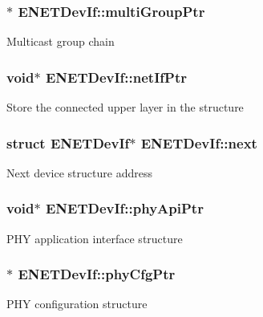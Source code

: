 \subsubsection[{\texorpdfstring{multi\+Group\+Ptr}{multiGroupPtr}}]{$\ast$ E\+N\+E\+T\+Dev\+If\+::multi\+Group\+Ptr}\hypertarget{structENETDevIf_ab01c067bf7f5d6b96698d4e1742de693}{}\label{structENETDevIf_ab01c067bf7f5d6b96698d4e1742de693}
Multicast group chain 
\subsubsection[{\texorpdfstring{net\+If\+Ptr}{netIfPtr}}]{\setlength{\rightskip}{0pt plus 5cm}void$\ast$ E\+N\+E\+T\+Dev\+If\+::net\+If\+Ptr}\hypertarget{structENETDevIf_a00a53ee84e7e89719ffcd7bd332c665f}{}\label{structENETDevIf_a00a53ee84e7e89719ffcd7bd332c665f}
Store the connected upper layer in the structure 
\subsubsection[{\texorpdfstring{next}{next}}]{\setlength{\rightskip}{0pt plus 5cm}struct {\bf E\+N\+E\+T\+Dev\+If}$\ast$ E\+N\+E\+T\+Dev\+If\+::next}\hypertarget{structENETDevIf_ab9a5c1191575dd02df163e36205fa5bd}{}\label{structENETDevIf_ab9a5c1191575dd02df163e36205fa5bd}
Next device structure address 
\subsubsection[{\texorpdfstring{phy\+Api\+Ptr}{phyApiPtr}}]{\setlength{\rightskip}{0pt plus 5cm}void$\ast$ E\+N\+E\+T\+Dev\+If\+::phy\+Api\+Ptr}\hypertarget{structENETDevIf_ade848b993084a443534865584337743b}{}\label{structENETDevIf_ade848b993084a443534865584337743b}
P\+HY application interface structure 
\subsubsection[{\texorpdfstring{phy\+Cfg\+Ptr}{phyCfgPtr}}]{$\ast$ E\+N\+E\+T\+Dev\+If\+::phy\+Cfg\+Ptr}\hypertarget{structENETDevIf_a66a02cf3079a6c45e0acc8c518d88d79}{}\label{structENETDevIf_a66a02cf3079a6c45e0acc8c518d88d79}
P\+HY configuration structure 

